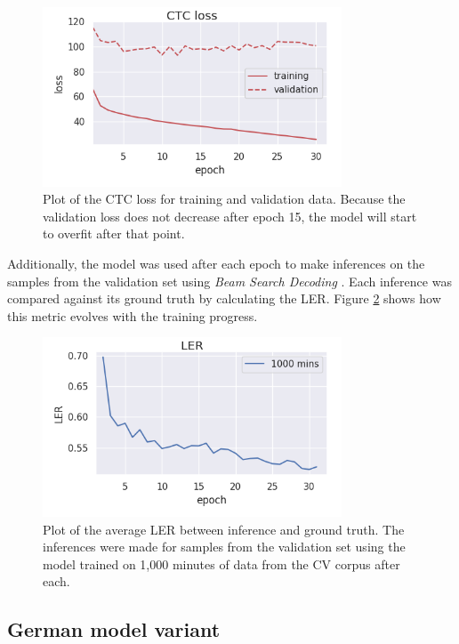 \documentclass[letterpaper]{article}
\begin{document}
\begin{figure}[!htb]
	\begin{center}
		\includegraphics[width=3.5in]{loss_en.png}
		\caption{Plot of the CTC loss for training and validation data. Because the validation loss does not decrease after epoch 15, the model will start to overfit after that point.}
		\label{loss_en}
	\end{center}
\end{figure}

Additionally, the model was used after each epoch to make inferences on the samples from the validation set using \textit{Beam Search Decoding} \parencite{ctc_paper}. Each inference was compared against its ground truth by calculating the LER. Figure \ref{ler_en} shows how this metric evolves with the training progress.

\begin{figure}[!htb]
	\begin{center}
		\includegraphics[width=3.5in]{ler_en.png}
		\caption{Plot of the average LER between inference and ground truth. The inferences were made for samples from the validation set using the model trained on 1,000 minutes of data from the CV corpus after each.}
		\label{ler_en}
	\end{center}
\end{figure}

\subsection{German model variant}
\end{document}
